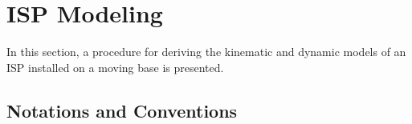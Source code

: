 \section{ISP Modeling}
\label{sec:modeling}

In this section, a procedure for deriving the kinematic and dynamic models of an ISP installed on a moving base is presented. 

\subsection{Notations and Conventions}
\label{sec:definitions}

